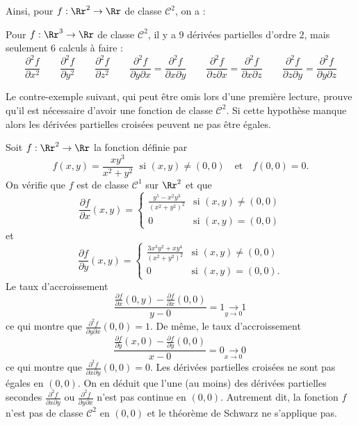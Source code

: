 Ainsi, pour $f : \Rr^2 \to \Rr$ de classe $\mathcal{C}^2$, on a :

Pour $f : \Rr^3 \to \Rr$ de classe $\mathcal{C}^2$, il y a $9$ dérivées partielles d'ordre $2$, mais seulement $6$ calculs à faire :
 $$\frac{\partial ^2 f}{\partial x^2}
 \qquad
 \frac{\partial ^2 f}{\partial y^2}
 \qquad
 \frac{\partial ^2 f}{\partial z^2}  
 \qquad 
 \frac{\partial ^2 f}{\partial y\partial x}= \frac{\partial ^2 f}{\partial x\partial y}
 \qquad
 \frac{\partial ^2 f}{\partial z\partial x}= \frac{\partial ^2 f}{\partial x\partial z}
 \qquad
 \frac{\partial ^2 f}{\partial z\partial y}= \frac{\partial ^2 f}{\partial y\partial z} 
 $$


Le contre-exemple suivant, qui peut être omis lors d'une première lecture, prouve qu'il est nécessaire d'avoir une fonction de classe $\mathcal{C}^2$. Si cette hypothèse manque alors les dérivées partielles croisées peuvent ne pas être égales.

\begin{exemple}
Soit $f: \Rr^2 \to \Rr$ la fonction définie par
$$f(x,y)=\frac{xy^3}{x^2+y^2}\;\mbox{ si }(x,y)\neq (0,0)\quad \mbox{et}\quad f(0,0)= 0.$$
On vérifie que $f$ est de classe $\mathcal{C}^1$ sur $\Rr^2$ et que
$$\frac{\partial f}{\partial x}(x,y)=\left\{\begin{array}{cl}\displaystyle \frac{y^5-x^2y^3}{(x^2+y^2)^2}&\mbox{si }(x,y)\neq (0,0)\\ 0&\mbox{si }(x,y)=(0,0)
\end{array}\right.$$
et 
$$\frac{\partial f}{\partial y}(x,y)=\left\{\begin{array}{cl}\displaystyle \frac{3x^3y^2+xy^4}{(x^2+y^2)^2}&\mbox{si }(x,y)\neq (0,0)\\ 0&\mbox{si }(x,y)=(0,0).\end{array}\right.$$
Le taux d'accroissement
$$\frac{\frac{\partial f}{\partial x}(0,y)-\frac{\partial f}{\partial x}(0,0)}{y-0}=1\underset{y\to 0\; \; \; }{\longrightarrow 1}$$
ce qui montre que $\displaystyle \frac{\partial ^2f}{\partial y\partial x}(0,0)=1$.
De même, le taux d'accroissement
$$\frac{\frac{\partial f}{\partial y}(x,0)-\frac{\partial f}{\partial y}(0,0)}{x-0}=0\underset{x\to 0\; \; \; }{\longrightarrow 0}$$
ce qui montre que $\displaystyle \frac{\partial ^2f}{\partial x\partial y}(0,0)=0$. 
Les dérivées partielles croisées ne sont pas égales en $(0,0)$.
On en déduit que l'une (au moins) des dérivées partielles secondes $\displaystyle \frac{\partial ^2f}{\partial x\partial y}$ ou $\displaystyle \frac{\partial ^2f}{\partial y\partial x}$ n'est pas continue en $(0,0)$. Autrement dit, la fonction $f$ n'est pas de classe $\mathcal{C}^2$ en $(0,0)$ et le théorème de Schwarz ne s'applique pas.
\end{exemple}


